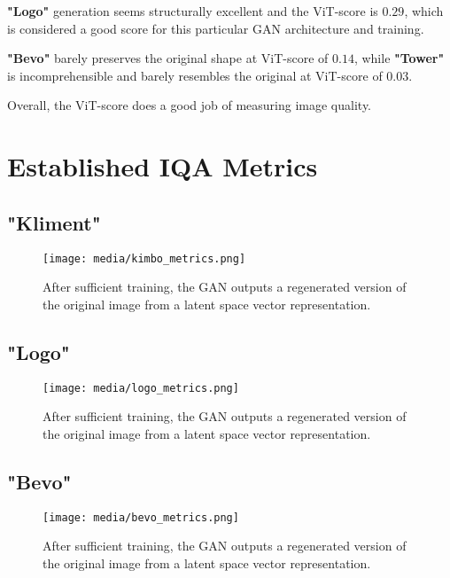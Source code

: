\textbf{"Logo"} generation seems structurally excellent and the ViT-score is $0.29$, which
is considered a good score for this particular GAN architecture and training.

\textbf{"Bevo"} barely preserves the original shape at ViT-score of $0.14$, while
\textbf{"Tower"} is incomprehensible and barely resembles the original at ViT-score of $0.03$.


Overall, the ViT-score does a good job of measuring image quality.


\section{Established IQA Metrics}

\subsection{"Kliment"}

\begin{figure}[H]
	\begin{center}
	\texttt{[image: media/kimbo\_metrics.png]}
	\end{center}
	\caption["Kliment" Established Metrics]{After sufficient training, the GAN outputs a regenerated
    version of the original image from a latent space vector representation.}
	\end{figure}

\subsection{"Logo"}

\begin{figure}[H]
	\begin{center}
	\texttt{[image: media/logo\_metrics.png]}
	\end{center}
	\caption["Logo" Established Metrics]{After sufficient training, the GAN outputs a regenerated
    version of the original image from a latent space vector representation.}
	\end{figure}


\subsection{"Bevo"}

\begin{figure}[H]
        \begin{center}
        \texttt{[image: media/bevo\_metrics.png]}
        \end{center}
        \caption["Bevo" Established Metrics]{After sufficient training, the GAN outputs a regenerated
        version of the original image from a latent space vector representation.}
        \end{figure}


